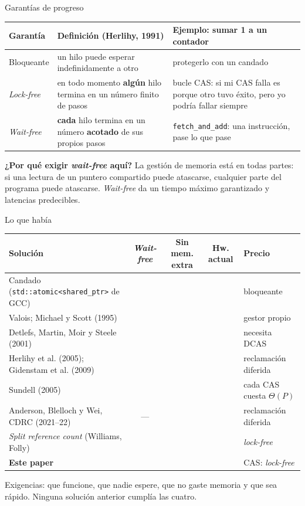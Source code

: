 \documentclass[aspectratio=169,11pt]{beamer}
\newcommand{\si}{\textcolor{ok}{\ding{51}}}
\newcommand{\no}{\textcolor{mal}{\ding{55}}}
\begin{document}
\begin{frame}{Garantías de progreso}
  \renewcommand{\arraystretch}{1.2}\small
  \begin{tabularx}{\linewidth}{@{}l X X@{}}
    \toprule
    \textbf{Garantía} & \textbf{Definición (Herlihy, 1991)} & \textbf{Ejemplo: sumar 1 a un contador}\\
    \midrule
    Bloqueante & un hilo puede esperar indefinidamente a otro & protegerlo con un candado\\
    \emph{Lock-free} & en todo momento \textbf{algún} hilo termina en un número finito de pasos & bucle CAS: si mi CAS falla es porque otro tuvo éxito, pero yo podría fallar siempre\\
    \emph{Wait-free} & \textbf{cada} hilo termina en un número \textbf{acotado} de sus propios pasos & \texttt{fetch\_and\_add}: una instrucción, pase lo que pase\\
    \bottomrule
  \end{tabularx}
  \vfill
  \small\textbf{¿Por qué exigir \emph{wait-free} aquí?} La gestión de memoria está en todas partes: si una lectura de un puntero compartido puede atascarse, cualquier parte del programa puede atascarse. \emph{Wait-free} da un tiempo máximo garantizado y latencias predecibles.
\end{frame}

\begin{frame}{Lo que había}
  \renewcommand{\arraystretch}{1.1}\footnotesize
  \begin{tabularx}{\linewidth}{@{}p{5.5cm} c c c X@{}}
    \toprule
    Solución & \emph{Wait-free} & Sin mem. extra & Hw. actual & Precio\\
    \midrule
    Candado (\texttt{std::atomic<shared\_ptr>} de GCC) & \no & \si & \si & bloqueante\\
    Valois; Michael y Scott (1995) & \no & \no & \si & gestor propio\\
    Detlefs, Martin, Moir y Steele (2001) & \no & \si & \no & necesita DCAS\\
    Herlihy et al. (2005); Gidenstam et al. (2009) & \no & \no & \si & reclamación diferida\\
    Sundell (2005) & \si & \si & \si & cada CAS cuesta $\Theta(P)$\\
    Anderson, Blelloch y Wei, CDRC (2021–22) & --- & \no & \si & reclamación diferida\\
    \emph{Split reference count} (Williams, Folly) & \no & \si & \si & \emph{lock-free}\\
    \midrule
    \textbf{Este paper} & \si & \si & \si & CAS: \emph{lock-free}\\
    \bottomrule
  \end{tabularx}
  \vfill
  \footnotesize Exigencias: que funcione, que nadie espere, que no gaste memoria y que sea rápido. Ninguna solución anterior cumplía las cuatro.
\end{frame}
\end{document}
